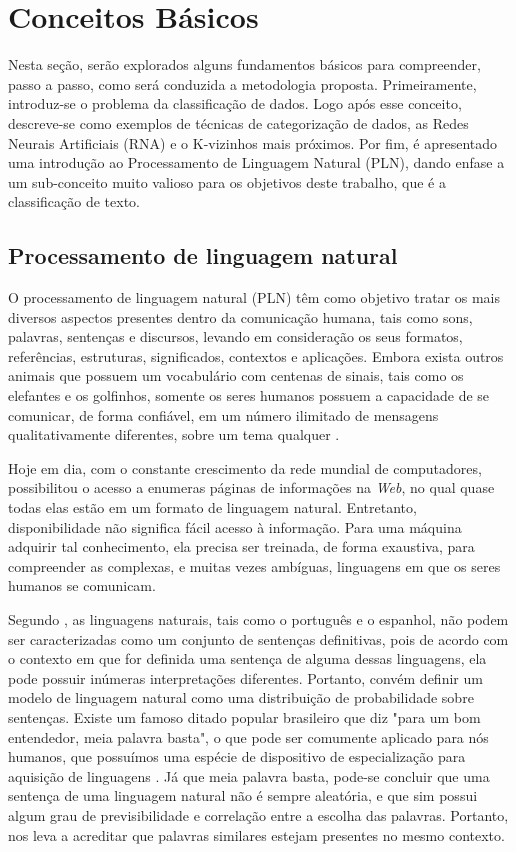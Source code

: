 \chapter{Conceitos Básicos}
Nesta seção, serão explorados alguns fundamentos básicos para compreender, passo a passo, como será conduzida a metodologia proposta. Primeiramente, introduz-se o problema da classificação de dados. Logo após esse conceito, descreve-se como exemplos de técnicas de categorização de dados, as Redes Neurais Artificiais (RNA) e o K-vizinhos mais próximos. Por fim, é apresentado uma introdução ao Processamento de Linguagem Natural (PLN), dando enfase a um sub-conceito muito valioso para os objetivos deste trabalho, que é a classificação de texto.

\section{Processamento de linguagem natural}
O processamento de linguagem natural (PLN) têm como objetivo tratar os mais diversos aspectos presentes dentro da comunicação humana, tais como sons, palavras, sentenças e discursos, levando em consideração os seus formatos, referências, estruturas, significados, contextos e aplicações. Embora exista outros animais que possuem um vocabulário com centenas de sinais, tais como os elefantes e os golfinhos, somente os seres humanos possuem a capacidade de se comunicar, de forma confiável, em um número ilimitado de mensagens qualitativamente diferentes, sobre um tema qualquer \citep{russell1994inteligencia, gonzalez2003recuperaccao}.

Hoje em dia, com o constante crescimento da rede mundial de computadores, possibilitou o acesso a enumeras páginas de informações na \textit{Web}, no qual quase todas elas estão em um formato de linguagem natural. Entretanto, disponibilidade não significa fácil acesso à informação. Para uma máquina adquirir tal conhecimento, ela precisa ser treinada, de forma exaustiva, para compreender as complexas, e muitas vezes ambíguas, linguagens em que os seres humanos se comunicam.

Segundo \cite{russell1994inteligencia}, as linguagens naturais, tais como o português e o espanhol, não podem ser caracterizadas como um conjunto de sentenças definitivas, pois de acordo com o contexto em que for definida uma sentença de alguma dessas linguagens, ela pode possuir inúmeras interpretações diferentes. Portanto, convém definir um modelo de linguagem natural como uma distribuição de probabilidade sobre sentenças. Existe um famoso ditado popular brasileiro que diz "para um bom entendedor, meia palavra basta", o que pode ser comumente aplicado para nós humanos, que possuímos uma espécie de dispositivo de especialização para aquisição de linguagens \citep{chomsky2014aspects}. Já que meia palavra basta, pode-se concluir que uma sentença de uma linguagem natural não é sempre aleatória, e que sim possui algum grau de previsibilidade e correlação entre a escolha das palavras. Portanto, nos leva a acreditar que palavras similares estejam presentes no mesmo contexto.

